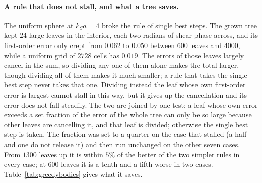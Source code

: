 \documentclass[11pt,a4paper]{article}
\begin{document}
\paragraph{A rule that does not stall, and what a tree saves.} The uniform sphere at $k_Sa=4$ broke the rule
of single best steps. The grown tree kept $24$ large leaves in the interior, each two radians of shear
phase across, and its first-order error only crept from $0.062$ to $0.050$ between $600$ leaves and $4000$, while a uniform
grid of $2728$ cells has $0.019$. The errors of those leaves largely cancel in the sum, so dividing any
one of them alone makes the total larger, though dividing all of them makes it much smaller; a rule that
takes the single best step never takes that one. Dividing instead the leaf whose own first-order error is
largest cannot stall in this way, but it gives up the cancellation and its error does not fall steadily.
The two are joined by one test: a leaf whose own error exceeds a set fraction of the error of the whole
tree can only be so large because other leaves are cancelling it, and that leaf is divided; otherwise the
single best step is taken. The fraction was set to a quarter on the case that stalled (a half and one do
not release it) and then run unchanged on the other seven cases. From $1300$ leaves up it is within $5\%$ of the
better of the two simpler rules in every case; at $600$ leaves it is a tenth and a fifth worse in two
cases. Table~\ref{tab:greedybodies} gives what it saves.
\end{document}
